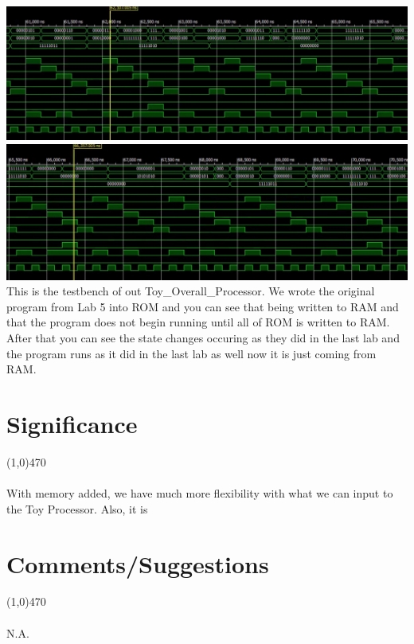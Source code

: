 \documentclass[12pt]{article}
\begin{document}
\begin{center}
	\includegraphics[scale=.4]{tb3.png}
	\includegraphics[scale=.4]{tb4.png}\\
	This is the testbench of out Toy\_Overall\_Processor. We wrote the original program from Lab 5 into ROM and you can see that being written to RAM and that the program does not begin running until all of ROM is written to RAM. After that you can see the state changes occuring as they did in the last lab and the program runs as it did in the last lab as well now it is just coming from RAM.
\end{center}

	\newpage
\section{Significance} \vspace{-.7cm} \line(1,0){470}
	\paragraph{} 
		With memory added, we have much more flexibility with what we can input to the Toy Processor. Also, it is 

 \section{Comments/Suggestions}\vspace{-.7cm} \line(1,0){470}
 	\paragraph{} 
 		N.A.
		
\end{document}
